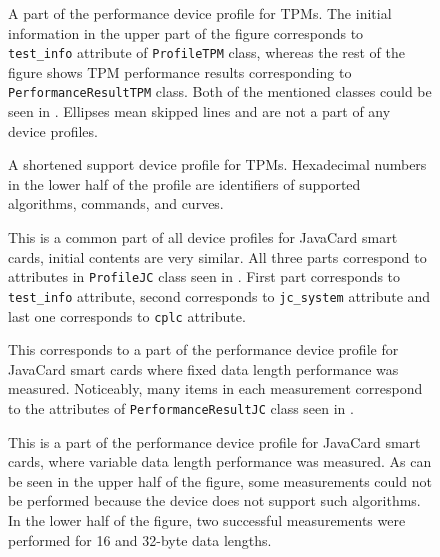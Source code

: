 \begin{figure}
    \centering
    
    \caption{A part of the performance device profile for TPMs. The initial information in the upper part of the figure corresponds to \texttt{test\_info} attribute of \texttt{ProfileTPM} class, whereas the rest of the figure shows TPM performance results corresponding to \texttt{PerformanceResultTPM} class. Both of the mentioned classes could be seen in . Ellipses mean skipped lines and are not a part of any device profiles.}
\end{figure}

\begin{figure}
    \centering
    
    \caption{A shortened support device profile for TPMs. Hexadecimal numbers in the lower half of the profile are identifiers of supported algorithms, commands, and curves.}
\end{figure}

\begin{figure}
    \centering
    
    \caption{This is a common part of all device profiles for JavaCard smart cards, initial contents are very similar. All three parts correspond to attributes in \texttt{ProfileJC} class seen in . First part corresponds to \texttt{test\_info} attribute, second corresponds to \texttt{jc\_system} attribute and last one corresponds to \texttt{cplc} attribute.}
\end{figure}

\begin{figure}
    \centering
    
    \caption{This corresponds to a part of the performance device profile for JavaCard smart cards where fixed data length performance was measured. Noticeably, many items in each measurement correspond to the attributes of \texttt{PerformanceResultJC} class seen in .}
\end{figure}

\begin{figure}
    \centering
    
    \caption{This is a part of the performance device profile for JavaCard smart cards, where variable data length performance was measured. As can be seen in the upper half of the figure, some measurements could not be performed because the device does not support such algorithms. In the lower half of the figure, two successful measurements were performed for 16 and 32-byte data lengths.}
\end{figure}

